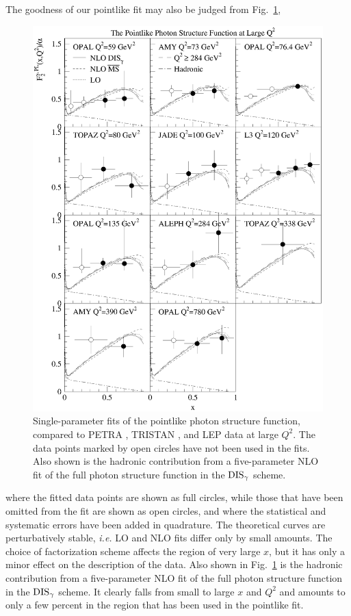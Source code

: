 \documentclass[aps,prl,twocolumn,groupedaddress]{revtex4}
\begin{document}
The goodness of our pointlike fit may also be judged from Fig.\ \ref{fig:1},
%
\begin{figure}
 \centering
 \includegraphics[width=0.9\columnwidth]{fig1}
 \caption{\label{fig:1}Single-parameter fits of the pointlike photon structure
 function, compared to PETRA \cite{Bartel:1984cg}, TRISTAN \cite{Sahu:1995gj,
 Muramatsu:1994rq}, and LEP \cite{Barate:1999qy,Acciarri:1998ig,
 Ackerstaff:1997ni,Ackerstaff:1997se,Abbiendi:2002te} data at large
 $Q^2$. The data points marked by open circles have not been used in
 the fits. Also shown is the hadronic contribution from a five-parameter NLO
 fit of the full photon structure function in the ${\rm DIS}_\gamma$ scheme.}
\end{figure}
%
where the fitted data points are shown as full circles, while those that have
been omitted from the fit are shown as open circles, and where the statistical
and systematic errors have been added in quadrature. The theoretical curves
are perturbatively stable, {\it i.e.} LO and NLO fits differ only by small
amounts. The choice of factorization scheme affects the region of very
large $x$, but it has only a minor effect on the description of the data. 
Also shown in Fig.\ \ref{fig:1} is the hadronic contribution from a
five-parameter NLO fit of the full photon structure
function in the ${\rm DIS}_\gamma$ scheme. It clearly falls from small to
large $x$ and $Q^2$ and amounts to only a few percent in the region that has
been used in the pointlike fit.
\end{document}
